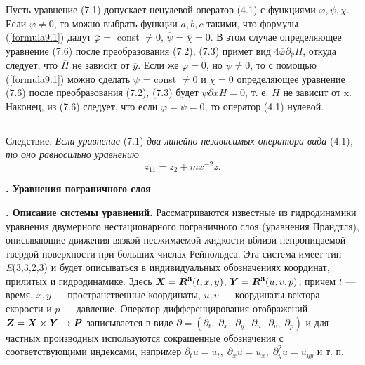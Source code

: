 \documentclass[twoside]{article}
\newcommand{\qedsymbol}
{
  \rule{2.5mm}{2.5mm}
}
\newcounter{nrazd}
\newcommand{\razd}[1]
{
  \addtocounter{nrazd}{1} 
  \setcounter{equation}{0} 
  \textbf{\thenrazd. #1} 
}
\newcommand{\bm}[1]
{
  \mbox{\boldmath{\(#1\)}}
}
\begin{document}
    Пусть уравнение (7.1) допускает ненулевой оператор (4.1) с функциями $\varphi, \psi, \chi$. Если $\varphi \neq 0$, то можно выбрать функции $a, b, c$ такими, что формулы (\ref{formula9.1}) дадут $\overline{\varphi}=$ const $\neq 0$, $\overline{\psi}=\overline{\chi}=0$. В этом случае определяющее уравнение (7.6) после преобразования (7.2), (7.3) примет вид $4\overline{\varphi} \partial_{\overline{y}} \overline{H}$, откуда следует, что $\overline{H}$ не зависит от $\overline{y}$. Если же $\varphi=0 $, но $\psi \neq 0 $, то с помощью (\ref{formula9.1}) можно сделать $\overline{\psi}$ = const $\neq 0$ и $\overline{\chi}=0$ определяющее уравнение (7.6) после преобразования (7.2), (7.3) будет $\overline{\psi}\partial\overline{x}\overline{H}=0 $, т. е. $\overline{H}$ не зависит от x. Наконец, из (7.6) следует, что если $\varphi=\psi=0$, то оператор (4.1) нулевой.
    \qedsymbol
    \par

    
    С\;л\;е\;д\;с\;т\;в\;и\;е. \textit{Если уравнение} (7.1) \textit{ два линейно независимых оператора вида} (4.1)\textit{, то оно равносильно уравнению} 
    $$z_{11} = z_2+mx^{-2}z.$$

\newpage


  \setcounter{nrazd}{0}



  \begin{center}
    \textbf{. Уравнения пограничного слоя}
  \end{center}\noindent 

  \razd{Описание системы уравнений.} Рассматриваются известные из гидродинамики уравнения двумерного нестационарного пограничного слоя (уравнения Прандтля), описывающие движения вязкой несжимаемой жидкости вблизи непроницаемой твердой поверхности при больших числах Рейнольдса. Эта система имеет тип \textit{E}(3,3,2,3) и будет описываться в индивидуальных обозначениях координат, прилитых и гидродинамике. Здесь $\bm{X}=\bm{R^3} (t, x, y)$, $\bm{Y}=\bm{R^3}(u, v, p)$, причем $t$ --- время, $x, y$ --- пространственные координаты, $u, v$ — координаты вектора скорости и $p$ --- давление. Оператор дифференцирования отображений $\bm{Z}=\bm{X}\times \bm{Y}\rightarrow \bm{P}$ записывается в виде $\partial = (\partial_t,\; \partial_x,\; \partial_y,\; \partial_u,\; \partial_v,\; \partial_p)$ и для частных производных используются сокращенные обозначения с соответствующими индексами, например $\partial_tu = u_t,\; \partial_xu = u_x,\; \partial_y^2u = u_{yy}$ и т. п.
\end{document}

